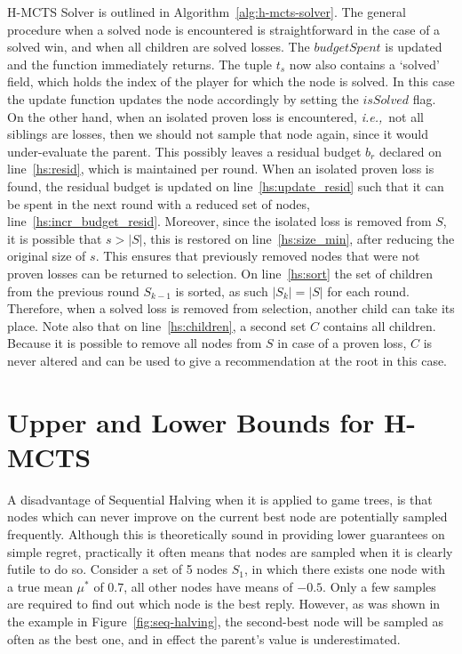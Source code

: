\documentclass{kecsmstr}
\newcommand{\ie}{{\it i.e.,}~}
\newcommand{\func}[1]{{\sc #1}}
\begin{document}
H-MCTS Solver is outlined in Algorithm~\ref{alg:h-mcts-solver}. The general procedure when a solved node is encountered is straightforward in the case of a solved win, and when all children are solved losses. The $budgetSpent$ is updated and the function immediately returns. The tuple $t_s$ now also contains a `solved' field, which holds the index of the player for which the node is solved. In this case the \func{update} function updates the node accordingly by setting the $isSolved$ flag. On the other hand, when an isolated proven loss is encountered, \ie not all siblings are losses, then we should not sample that node again, since it would under-evaluate the parent. This possibly leaves a residual budget $b_r$ declared on line~\ref{hs:resid}, which is maintained per round. When an isolated proven loss is found, the residual budget is updated on line~\ref{hs:update_resid} such that it can be spent in the next round with a reduced set of nodes, line~\ref{hs:incr_budget_resid}. Moreover, since the isolated loss is removed from $S$, it is possible that $s > |S|$, this is restored on line~\ref{hs:size_min}, after reducing the original size of $s$. This ensures that previously removed nodes that were not proven losses can be returned to selection. On line~\ref{hs:sort} the set of children from the previous round $S_{k-1}$ is sorted, as such $|S_k| = |S|$ for each round. Therefore, when a solved loss is removed from selection, another child can take its place. Note also that on line~\ref{hs:children}, a second set $C$ contains all children. Because it is possible to remove all nodes from $S$ in case of a proven loss, $C$ is never altered and can be used to give a recommendation at the root in this case.
\newpage
\section{Upper and Lower Bounds for H-MCTS}
\label{sec:ulb_h-mcts}
A disadvantage of Sequential Halving when it is applied to game trees, is that nodes which can never improve on the current best node are potentially sampled frequently. Although this is theoretically sound in providing lower guarantees on simple regret, practically it often means that nodes are sampled when it is clearly futile to do so. Consider a set of 5 nodes $S_1$, in which there exists one node with a true mean $\mu^*$ of $0.7$, all other nodes have means of $-0.5$. Only a few samples are required to find out which node is the best reply. However, as was shown in the example in Figure~\ref{fig:seq-halving}, the second-best node will be sampled as often as the best one, and in effect the parent's value is underestimated. 
\end{document}
